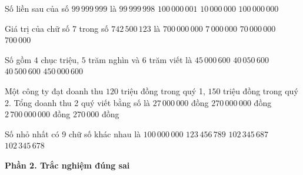 \begin{ex} %
Số liền sau của số $99\,999\,999$ là
\choice
{$99\,999\,998$}
{$100\,000\,001$}
{$10\,000\,000$}
{\True $100\,000\,000$}
\end{ex}

\begin{ex} %
Giá trị của chữ số 7 trong số $742\,500\,123$ là
\choice
{\True $700\,000\,000$}
{$7\,000\,000$}
{$70\,000\,000$}
{$700\,000$}
\end{ex}

\begin{ex} %
Số gồm $4$ chục triệu, $5$ trăm nghìn và $6$ trăm viết là
\choice
{$45\,000\,600$}
{$40\,050\,600$}
{\True $40\,500\,600$}
{$450\,000\,600$}
\end{ex}

\begin{ex} %
Một công ty đạt doanh thu $120$ triệu đồng trong quý 1, $150$ triệu đồng trong quý 2. Tổng doanh thu 2 quý viết bằng số là
\choice
{$27\,000\,000$ đồng}
{\True $270\,000\,000$ đồng}
{$2\,700\,000\,000$ đồng}
{$270\,000$ đồng}
\end{ex}

\begin{ex} %
Số nhỏ nhất có 9 chữ số khác nhau là
\choice
{$100\,000\,000$}
{$123\,456\,789$}
{$102\,345\,687$}
{\True $102\,345\,678$}
\end{ex}

\textbf{Phần 2. Trắc nghiệm đúng sai}


